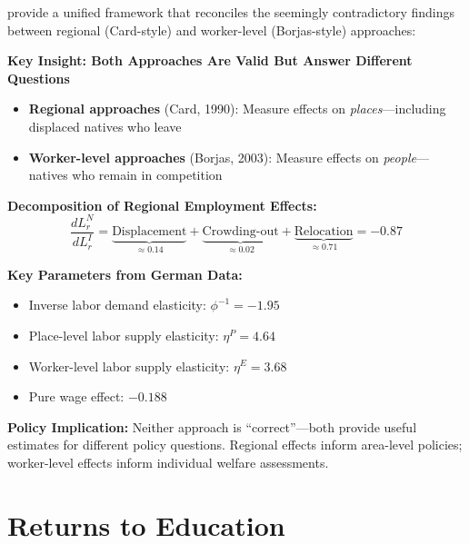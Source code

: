 \citet{PAP-dustmann2025immigration} provide a unified framework that reconciles the seemingly contradictory findings between regional (Card-style) and worker-level (Borjas-style) approaches:

\begin{tcolorbox}[colback=blue!5!white, colframe=blue!75!black]
\textbf{Key Insight: Both Approaches Are Valid But Answer Different Questions}
\begin{itemize}
    \item \textbf{Regional approaches} (Card, 1990): Measure effects on \textit{places}---including displaced natives who leave
    \item \textbf{Worker-level approaches} (Borjas, 2003): Measure effects on \textit{people}---natives who remain in competition
\end{itemize}
\end{tcolorbox}

\textbf{Decomposition of Regional Employment Effects:}
\begin{equation}
\frac{dL^N_r}{dL^I_r} = \underbrace{\text{Displacement}}_{\approx 0.14} + \underbrace{\text{Crowding-out}}_{\approx 0.02} + \underbrace{\text{Relocation}}_{\approx 0.71} = -0.87
\end{equation}

\textbf{Key Parameters from German Data:}
\begin{itemize}
    \item Inverse labor demand elasticity: $\phi^{-1} = -1.95$
    \item Place-level labor supply elasticity: $\eta^P = 4.64$
    \item Worker-level labor supply elasticity: $\eta^E = 3.68$
    \item Pure wage effect: $-0.188$
\end{itemize}

\textbf{Policy Implication:} Neither approach is ``correct''---both provide useful estimates for different policy questions. Regional effects inform area-level policies; worker-level effects inform individual welfare assessments.

\section{Returns to Education}

